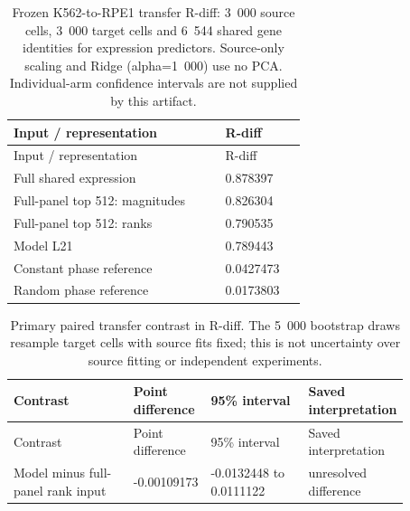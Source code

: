\begin{longtable}{@{}L{0.63\linewidth}L{0.24\linewidth}@{}}
\caption{Frozen K562-to-RPE1 transfer R-diff: 3~000 source cells, 3~000 target cells and 6~544 shared gene identities for expression predictors. Source-only scaling and Ridge (alpha=1~000) use no PCA. Individual-arm confidence intervals are not supplied by this artifact.}\\
\toprule
Input / representation & R-diff \\
\midrule
\endfirsthead
\toprule
Input / representation & R-diff \\
\midrule
\endhead
\endfoot
\bottomrule
\endlastfoot
Full shared expression & 0.878397 \\
Full-panel top 512: magnitudes & 0.826304 \\
Full-panel top 512: ranks & 0.790535 \\
Model L21 & 0.789443 \\
Constant phase reference & 0.0427473 \\
Random phase reference & 0.0173803 \\
\end{longtable}
\begin{longtable}{@{}L{0.31\linewidth}L{0.15\linewidth}L{0.25\linewidth}L{0.16\linewidth}@{}}
\caption{Primary paired transfer contrast in R-diff. The 5~000 bootstrap draws resample target cells with source fits fixed; this is not uncertainty over source fitting or independent experiments.}\\
\toprule
Contrast & Point difference & 95\% interval & Saved interpretation \\
\midrule
\endfirsthead
\toprule
Contrast & Point difference & 95\% interval & Saved interpretation \\
\midrule
\endhead
\endfoot
\bottomrule
\endlastfoot
Model minus full-panel rank input & -0.00109173 & -0.0132448 to 0.0111122 & unresolved difference \\
\end{longtable}
